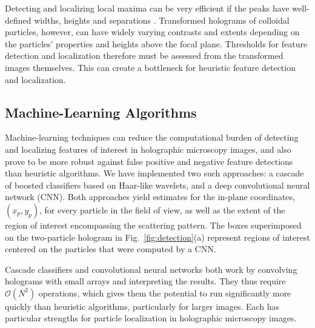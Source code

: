 Detecting and localizing local maxima can be very
efficient if the peaks have well-defined widths,
heights and separations \cite{crocker96,allan16trackpy}.
Transformed holograms of colloidal particles, however,
can have widely varying contrasts
and extents depending on the particles' properties and
heights above the focal plane.
Thresholds for feature detection and localization therefore
must be assessed from the transformed images
themselves.
This can create a bottleneck
for
heuristic feature detection and localization.

\subsection{Machine-Learning Algorithms}

Machine-learning techniques can reduce the computational
burden of detecting and localizing features of interest in
holographic microscopy images, and also prove to be more
robust against false positive and negative feature detections
than heuristic algorithms.
We have implemented two such approaches:
a cascade of boosted classifiers based on Haar-like wavelets,
and a deep convolutional neural network (CNN).
Both approaches yield estimates for the in-plane
coordinates, $(x_p, y_p)$, for every particle in the field
of view, as well as the extent of the region of interest
encompassing the scattering pattern.
The boxes superimposed on the two-particle hologram in
Fig.~\ref{fig:detection}(a) represent
regions of interest centered on the particles
that were computed by a CNN.

Cascade classifiers and convolutional neural networks
both work by convolving holograms with
small arrays and interpreting the results.
They thus require $\mathcal{O}\left ( N^2 \right )$ operations, which 
gives them the potential to run significantly more
quickly than heuristic algorithms, particularly for
larger images.
Each has particular strengths for particle localization
in holographic microscopy images.

